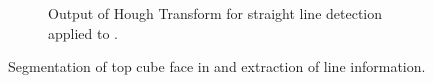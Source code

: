 \begin{figure}[H]
\begin{subfigure}[b]{0.4\textwidth}
        \caption{Output of Hough Transform for straight line detection applied to .}
        \label{fig:blue-cube-top-hough}
    \end{subfigure}
    \captionsetup{singlelinecheck = false, justification=justified}
    \caption{Segmentation of top cube face in  and extraction of line information.}
    \label{fig:blue-cube-segment}
\end{figure}

\pendsign